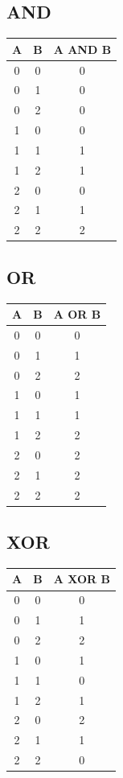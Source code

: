 \documentclass[12pt]{article}
\begin{document}
\subsection{AND}
\centering
\begin{tabular}{|c|c|c|}
	\hline
	\textbf{A} & \textbf{B} & \textbf{A} AND \textbf{B}\\\hline
	0&0&0\\\hline
	0&1&0\\\hline
	0&2&0\\\hline
	1&0&0\\\hline
	1&1&1\\\hline
	1&2&1\\\hline
	2&0&0\\\hline
	2&1&1\\\hline
	2&2&2\\\hline
\end{tabular}
\subsection{OR}
\centering
\begin{tabular}{|c|c|c|}
	\hline
	\textbf{A} & \textbf{B} & \textbf{A} OR \textbf{B}\\\hline
	0&0&0\\\hline
	0&1&1\\\hline
	0&2&2\\\hline
	1&0&1\\\hline
	1&1&1\\\hline
	1&2&2\\\hline
	2&0&2\\\hline
	2&1&2\\\hline
	2&2&2\\\hline
\end{tabular}
\subsection{XOR}
\centering
\begin{tabular}{|c|c|c|}
	\hline
	\textbf{A} & \textbf{B} & \textbf{A} XOR \textbf{B}\\\hline
	0&0&0\\\hline
	0&1&1\\\hline
	0&2&2\\\hline
	1&0&1\\\hline
	1&1&0\\\hline
	1&2&1\\\hline
	2&0&2\\\hline
	2&1&1\\\hline
	2&2&0\\\hline
\end{tabular}
\end{document}
